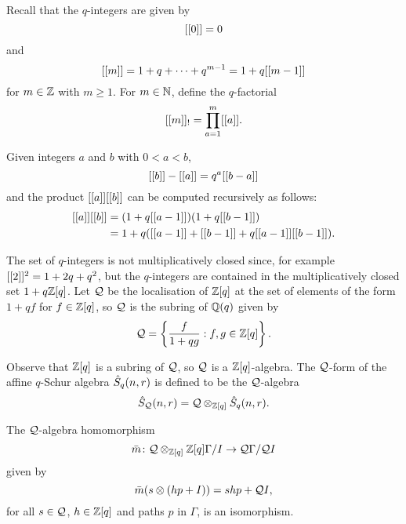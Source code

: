 \documentclass[a4paper, 11pt, twoside]{report}
\begin{document}
Recall that the $q$-integers are given by
\begin{equation*}
[[0]]=0
\end{equation*}
and
\begin{equation*}
[[m]] = 1+q+\cdots +q^{m-1} = 1+q[[m-1]]
\end{equation*}
for $m\in\mathbb{Z}$ with $m\geq 1$. For $m\in\mathbb{N}$, define the $q$-factorial
\begin{equation*}
[[m]]_! = \prod_{a=1}^{m}[[a]].
\end{equation*}

Given integers $a$ and $b$ with $0<a<b$,
\begin{equation*}
[[b]]-[[a]] = q^a[[b-a]]
\end{equation*}
and the product $[[a]][[b]]$ can be computed recursively as follows:
\begin{align*}
[[a]][[b]] &= (1+q[[a-1]])(1+q[[b-1]])\\
&= 1 +q([[a-1]] +[[b-1]] +q[[a-1]][[b-1]]).
\end{align*}

The set of $q$-integers is not multiplicatively closed since, for example $[[2]]^2 = 1+2q+q^2$, but the $q$-integers are contained in the multiplicatively closed set $1+q\mathbb{Z}[q]$. Let $\mathcal{Q}$ be the localisation of $\mathbb{Z}[q]$ at the set of elements of the form $1+qf$ for $f\in\mathbb{Z}[q]$, so $\mathcal{Q}$ is the subring of $\mathbb{Q}(q)$ given by
\begin{equation*}
\mathcal{Q} = \left\{\frac{f}{1+qg}:f,g\in\mathbb{Z}[q]\right\}.
\end{equation*}

Observe that $\mathbb{Z}[q]$ is a subring of $\mathcal{Q}$, so $\mathcal{Q}$ is a $\mathbb{Z}[q]$-algebra. The $\mathcal{Q}$-form of the affine $q$-Schur algebra $\hat{S}_q(n,r)$ is defined to be the $\mathcal{Q}$-algebra
\begin{equation*} 
\hat{S}_{\mathcal{Q}}(n,r) = \mathcal{Q}\otimes_{\mathbb{Z}[q]}\hat{S}_q(n,r).
\end{equation*}

\begin{lemma}
The $\mathcal{Q}$-algebra homomorphism
\begin{equation*}
\bar{m}\colon \mathcal{Q}\otimes_{\mathbb{Z}[q]} \mathbb{Z}[q]\Gamma/{I}\to \mathcal{Q}\Gamma/{\mathcal{Q} I}
\end{equation*}
given by
\begin{equation*}
\bar{m}(s\otimes (hp+I)) = shp + \mathcal{Q} I,
\end{equation*}
for all $s\in\mathcal{Q}$, $h\in\mathbb{Z}[q]$ and paths $p$ in $\Gamma$, is an isomorphism.
\end{lemma}
\end{document}
